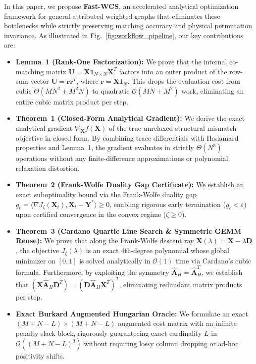 \documentclass[conference]{IEEEtran}
\begin{document}
In this paper, we propose \textbf{Fast-WCS}, an accelerated analytical optimization framework for general attributed weighted graphs that eliminates these bottlenecks while strictly preserving matching accuracy and physical permutation invariance. As illustrated in Fig.~\ref{fig:workflow_pipeline}, our key contributions are:

\begin{itemize}
    \item \textbf{Lemma~1 (Rank-One Factorization):} We prove that the internal co-matching matrix $\mathbf{U} = \mathbf{X}\mathbf{1}_{N\times N}\mathbf{X}^T$ factors into an outer product of the row-sum vector $\mathbf{U} = \mathbf{r}\mathbf{r}^T$, where $\mathbf{r} = \mathbf{X}\mathbf{1}_N$. This drops the evaluation cost from cubic $\Theta(MN^2 + M^2N)$ to quadratic $\mathcal{O}(MN + M^2)$ work, eliminating an entire cubic matrix product per step.
    \item \textbf{Theorem~1 (Closed-Form Analytical Gradient):} We derive the exact analytical gradient $\nabla_{\mathbf{X}} f(\mathbf{X})$ of the true unrelaxed structural mismatch objective in closed form. By combining trace differentials with Hadamard properties and Lemma~1, the gradient evaluates in strictly $\Theta(N^3)$ operations without any finite-difference approximations or polynomial relaxation distortion.
    \item \textbf{Theorem~2 (Frank-Wolfe Duality Gap Certificate):} We establish an exact suboptimality bound via the Frank-Wolfe duality gap $g_t = \langle \nabla J_\zeta(\mathbf{X}_t), \mathbf{X}_t - \mathbf{Y}^* \rangle \geq 0$, enabling rigorous early termination ($g_t < \varepsilon$) upon certified convergence in the convex regime ($\zeta \geq 0$).
    \item \textbf{Theorem~3 (Cardano Quartic Line Search \& Symmetric GEMM Reuse):} We prove that along the Frank-Wolfe descent ray $\mathbf{X}(\lambda) = \mathbf{X} - \lambda \mathbf{D}$, the objective $J_\zeta(\lambda)$ is an exact 4th-degree polynomial whose global minimizer on $[0, 1]$ is solved analytically in $\mathcal{O}(1)$ time via Cardano's cubic formula. Furthermore, by exploiting the symmetry $\hat{\mathbf{A}}_H = \hat{\mathbf{A}}_H^T$, we establish that $(\mathbf{X}\hat{\mathbf{A}}_H\mathbf{D}^T) = (\mathbf{D}\hat{\mathbf{A}}_H\mathbf{X}^T)^T$, eliminating redundant matrix products per step.
    \item \textbf{Exact Burkard Augmented Hungarian Oracle:} We formulate an exact $(M+N-L) \times (M+N-L)$ augmented cost matrix with an infinite penalty slack block, rigorously guaranteeing exact cardinality $L$ in $\mathcal{O}((M+N-L)^3)$ without requiring lossy column dropping or ad-hoc positivity shifts.

\end{itemize}
\end{document}
